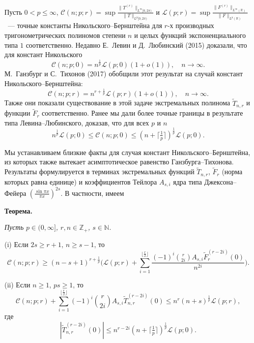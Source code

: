 \vzmscaption

Пусть $0<p\le \infty$, $\mathcal{C}(n;p;r)=\sup
\frac{\|T^{(r)}\|_{L^{\infty}[0,2\pi)}}{\|T\|_{L^{p}[0,2\pi)}}$ и
$\mathcal{L}(p;r)=\sup
\frac{\|F^{(r)}\|_{L^{\infty}(\mathbb{R})}}{\|F\|_{L^{p}(\mathbb{R})}}$~---
точные константы Никольского--Бернштейна для $r$-х производных
тригонометрических полиномов степени $n$ и целых функций экспоненциального типа
$1$ соответственно. Недавно Е.~Левин и Д.~Любинский (2015) доказали, что для
констант Никольского
\[
\mathcal{C}(n;p;0)=n^{\frac{1}{p}}\mathcal{L}(p;0)(1+o(1)),\quad n\to \infty.
\]
М.~Ганзбург и С.~Тихонов (2017) обобщили этот результат на случай констант
Никольского--Бернштейна:
\[
\mathcal{C}(n;p;r)=n^{r+\frac{1}{p}}\mathcal{L}(p;r)(1+o(1)),\quad n\to \infty.
\]
Также они показали существование в этой задаче экстремальных полинома
$\tilde{T}_{n,r}$ и функции $\tilde{F}_{r}$ соответственно. Ранее мы дали более
точные границы в результате типа Левина--Любинского, доказав, что для всех $p$
и $n$
\[
n^{\frac{1}{p}}\mathcal{L}(p;0)\le \mathcal{C}(n;p;0)\le (n+\lceil
\tfrac{1}{p}\rceil)^{\frac{1}{p}}\mathcal{L}(p;0).
\]

Мы устанавливаем близкие факты для случая констант Никольского--Бернштейна, из
которых также вытекает асимптотическое равенство Ганзбурга--Тихонова.
Результаты формулируется в терминах экстремальных функций $\tilde{T}_{n,r}$,
$\tilde{F}_{r}$ (норма которых равна единице) и коэффициентов Тейлора $A_{s,i}$
ядра типа Джексона--Фейера $(\frac{\sin \pi x}{\pi x})^{2s}$. В частности,
имеем

\textbf{Теорема.} {\it Пусть $p\in (0,\infty]$, $r,n\in \mathbb{Z}_{+}$, $s\in
\mathbb{N}$.

\textup{(i)} Если $2s\ge r+1$, $n\ge s-1$, то
\[
\mathcal{C}(n;p;r)\ge (n-s+1)^{r+\frac{1}{p}}\biggl(\mathcal{L}(p;r)+
\sum_{i=1}^{\lfloor
\frac{r}{2}\rfloor}\frac{(-1)^{i}\binom{r}{2i}A_{s,i}\tilde{F}_{r}^{(r-2i)}(0)}{n^{2i}}\biggr).
\]

\textup{(ii)} Если $n\ge 1$, $ps\ge 1$, то
\[
\mathcal{C}(n;p;r)+\sum_{i=1}^{\lfloor \frac{r}{2}\rfloor}(-1)^{i}\binom{r}{2i}A_{s,i}
\tilde{T}_{n,r}^{(r-2i)}(0)\le n^{r}(n+s)^{\frac{1}{p}}\mathcal{L}(p;r),
\]
где
\[
|\tilde{T}_{n,r}^{(r-2i)}(0)|\le n^{r-2i}(n+\lceil
\tfrac{1}{p}\rceil)^{\frac{1}{p}}\mathcal{L}(p;0).
\]
}